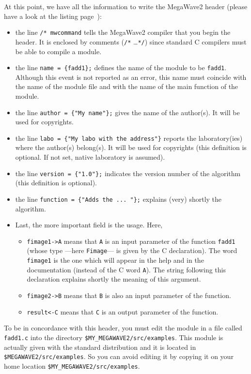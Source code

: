 At this point, we have all the information to write the MegaWave2 header (please
have a look at the listing page~\pageref{listing_fadd1}):
\begin{itemize}
\item the line \verb+/* mwcommand+ tells the MegaWave2 compiler that you begin the header. 
It is enclosed by comments (\verb+/*+ \ldots \verb+*/+) since standard C compilers must be able to compile a module.
\item the line \verb+name = {fadd1};+ defines the name of the module to be \verb+fadd1+.
Although this event is not reported as an error, this name must coincide with the name of the module file and with the name of the main function of the module.
\item the line \verb+author = {"My name"};+ gives the name of the author(s). It will be used for copyrights.
\item the line \verb+labo = {"My labo with the address"}+ reports the laboratory(ies) where the author(s) belong(s). It will be used for copyrights (this definition is optional. If not set, native laboratory is assumed).
\item the line \verb+version = {"1.0"};+ indicates the version number of the algorithm (this definition is optional).
\item the line \verb+function = {"Adds the ... "};+ explains (very) shortly the algorithm.
\item Last, the more important field is the usage. Here,
\begin{itemize}
\item \verb+fimage1->A+ means that \verb+A+ is an input parameter of the function \verb+fadd1+ (whose type ---here \verb+Fimage+--- is given by the C declaration). 
The word \verb+fimage1+ is the one which will appear in the help and in the documentation (instead of the C word \verb+A+).
The string following this declaration explains shortly the meaning of this argument.
\item \verb+fimage2->B+ means that \verb+B+ is also an input parameter of the function.
\item \verb+result<-C+ means that \verb+C+ is an output parameter of the function.
\end{itemize}
\end{itemize}
To be in concordance with this header, you must edit the module in a file
called \verb+fadd1.c+ into the directory \verb+$MY_MEGAWAVE2/src/examples+.
This module is actually given with the standard distribution and it is located in
 \verb+$MEGAWAVE2/src/examples+. 
So you can avoid editing it by copying it on your home location \verb+$MY_MEGAWAVE2/src/examples+.

